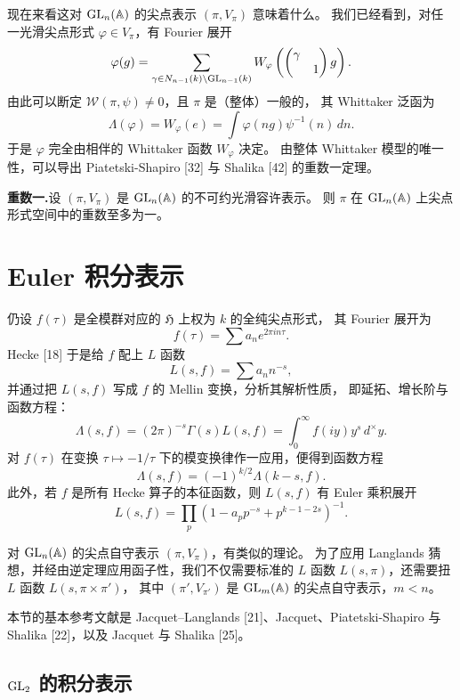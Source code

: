 现在来看这对 $\mathrm{GL}_n(\mathbb{A})$ 的尖点表示 $(\pi,V_\pi)$ 意味着什么。
我们已经看到，对任一光滑尖点形式 $\varphi\in V_\pi$，有 Fourier 展开
\[
\varphi(g)=\sum_{\gamma\in N_{n-1}(k)\backslash\mathrm{GL}_{n-1}(k)}
W_\varphi\left(\begin{pmatrix}\gamma&\\&1\end{pmatrix}g\right).
\]
由此可以断定 $\mathcal{W}(\pi,\psi)\neq0$，且 $\pi$ 是（整体）一般的，
其 Whittaker 泛函为
\[
\Lambda(\varphi)=W_\varphi(e)=\int\varphi(ng)\psi^{-1}(n)\,dn.
\]
于是 $\varphi$ 完全由相伴的 Whittaker 函数 $W_\varphi$ 决定。
由整体 Whittaker 模型的唯一性，可以导出 Piatetski-Shapiro [32] 与
Shalika [42] 的重数一定理。

\textbf{重数一.}\quad 设 $(\pi,V_\pi)$ 是 $\mathrm{GL}_n(\mathbb{A})$ 的不可约光滑容许表示。
则 $\pi$ 在 $\mathrm{GL}_n(\mathbb{A})$ 上尖点形式空间中的重数至多为一。

\section{Euler 积分表示}

仍设 $f(\tau)$ 是全模群对应的 $\mathfrak{H}$ 上权为 $k$ 的全纯尖点形式，
其 Fourier 展开为
\[
f(\tau)=\sum a_ne^{2\pi in\tau}.
\]
Hecke [18] 于是给 $f$ 配上 $L$ 函数
\[
L(s,f)=\sum a_nn^{-s},
\]
并通过把 $L(s,f)$ 写成 $f$ 的 Mellin 变换，分析其解析性质，
即延拓、增长阶与函数方程：
\[
\Lambda(s,f)=(2\pi)^{-s}\Gamma(s)L(s,f)=\int_0^\infty f(iy)y^s\,d^\times y.
\]
对 $f(\tau)$ 在变换 $\tau\mapsto-1/\tau$ 下的模变换律作一应用，便得到函数方程
\[
\Lambda(s,f)=(-1)^{k/2}\Lambda(k-s,f).
\]
此外，若 $f$ 是所有 Hecke 算子的本征函数，则 $L(s,f)$ 有 Euler 乘积展开
\[
L(s,f)=\prod_p(1-a_pp^{-s}+p^{k-1-2s})^{-1}.
\]

对 $\mathrm{GL}_n(\mathbb{A})$ 的尖点自守表示 $(\pi,V_\pi)$，有类似的理论。
为了应用 Langlands 猜想，并经由逆定理应用函子性，我们不仅需要标准的
$L$ 函数 $L(s,\pi)$，还需要扭 $L$ 函数 $L(s,\pi\times\pi')$，
其中 $(\pi',V_{\pi'})$ 是 $\mathrm{GL}_m(\mathbb{A})$ 的尖点自守表示，$m<n$。

本节的基本参考文献是 Jacquet--Langlands [21]、Jacquet、Piatetski-Shapiro 与
Shalika [22]，以及 Jacquet 与 Shalika [25]。

\subsection{$\mathrm{GL}_2$ 的积分表示}

